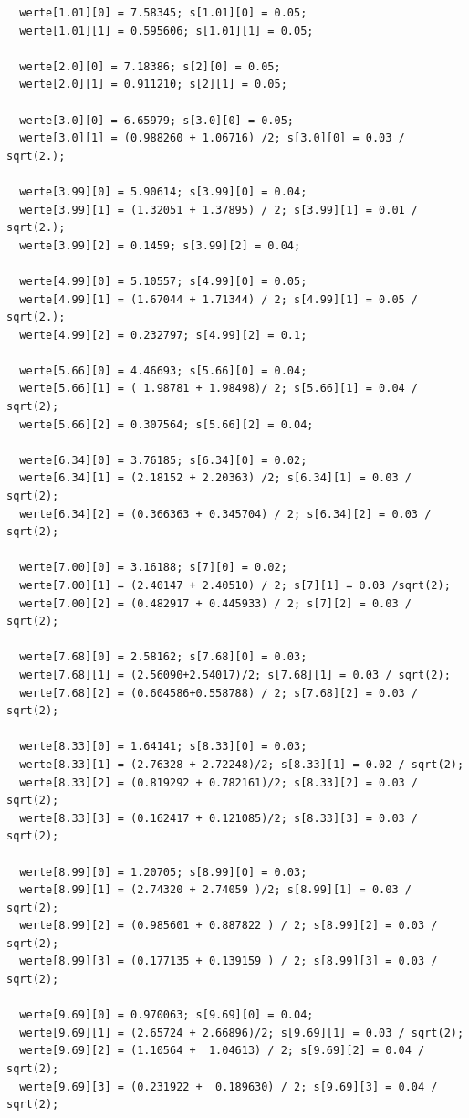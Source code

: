 \begin{appendix}
\begin{verbatim}
  werte[1.01][0] = 7.58345; s[1.01][0] = 0.05;
  werte[1.01][1] = 0.595606; s[1.01][1] = 0.05;

  werte[2.0][0] = 7.18386; s[2][0] = 0.05;
  werte[2.0][1] = 0.911210; s[2][1] = 0.05;
  
  werte[3.0][0] = 6.65979; s[3.0][0] = 0.05;
  werte[3.0][1] = (0.988260 + 1.06716) /2; s[3.0][0] = 0.03 / sqrt(2.);
  
  werte[3.99][0] = 5.90614; s[3.99][0] = 0.04;
  werte[3.99][1] = (1.32051 + 1.37895) / 2; s[3.99][1] = 0.01 / sqrt(2.);
  werte[3.99][2] = 0.1459; s[3.99][2] = 0.04;
  
  werte[4.99][0] = 5.10557; s[4.99][0] = 0.05;
  werte[4.99][1] = (1.67044 + 1.71344) / 2; s[4.99][1] = 0.05 / sqrt(2.);
  werte[4.99][2] = 0.232797; s[4.99][2] = 0.1;
  
  werte[5.66][0] = 4.46693; s[5.66][0] = 0.04;
  werte[5.66][1] = ( 1.98781 + 1.98498)/ 2; s[5.66][1] = 0.04 / sqrt(2);
  werte[5.66][2] = 0.307564; s[5.66][2] = 0.04;
  
  werte[6.34][0] = 3.76185; s[6.34][0] = 0.02;
  werte[6.34][1] = (2.18152 + 2.20363) /2; s[6.34][1] = 0.03 / sqrt(2);
  werte[6.34][2] = (0.366363 + 0.345704) / 2; s[6.34][2] = 0.03 / sqrt(2);
  
  werte[7.00][0] = 3.16188; s[7][0] = 0.02;
  werte[7.00][1] = (2.40147 + 2.40510) / 2; s[7][1] = 0.03 /sqrt(2);
  werte[7.00][2] = (0.482917 + 0.445933) / 2; s[7][2] = 0.03 / sqrt(2);
  
  werte[7.68][0] = 2.58162; s[7.68][0] = 0.03;
  werte[7.68][1] = (2.56090+2.54017)/2; s[7.68][1] = 0.03 / sqrt(2);
  werte[7.68][2] = (0.604586+0.558788) / 2; s[7.68][2] = 0.03 / sqrt(2);
  
  werte[8.33][0] = 1.64141; s[8.33][0] = 0.03;
  werte[8.33][1] = (2.76328 + 2.72248)/2; s[8.33][1] = 0.02 / sqrt(2);
  werte[8.33][2] = (0.819292 + 0.782161)/2; s[8.33][2] = 0.03 / sqrt(2);
  werte[8.33][3] = (0.162417 + 0.121085)/2; s[8.33][3] = 0.03 / sqrt(2);
  
  werte[8.99][0] = 1.20705; s[8.99][0] = 0.03;
  werte[8.99][1] = (2.74320 + 2.74059 )/2; s[8.99][1] = 0.03 / sqrt(2);
  werte[8.99][2] = (0.985601 + 0.887822 ) / 2; s[8.99][2] = 0.03 / sqrt(2);
  werte[8.99][3] = (0.177135 + 0.139159 ) / 2; s[8.99][3] = 0.03 / sqrt(2);
  
  werte[9.69][0] = 0.970063; s[9.69][0] = 0.04;
  werte[9.69][1] = (2.65724 + 2.66896)/2; s[9.69][1] = 0.03 / sqrt(2);
  werte[9.69][2] = (1.10564 +  1.04613) / 2; s[9.69][2] = 0.04 / sqrt(2);
  werte[9.69][3] = (0.231922 +  0.189630) / 2; s[9.69][3] = 0.04 / sqrt(2);
\end{verbatim}

\end{appendix}